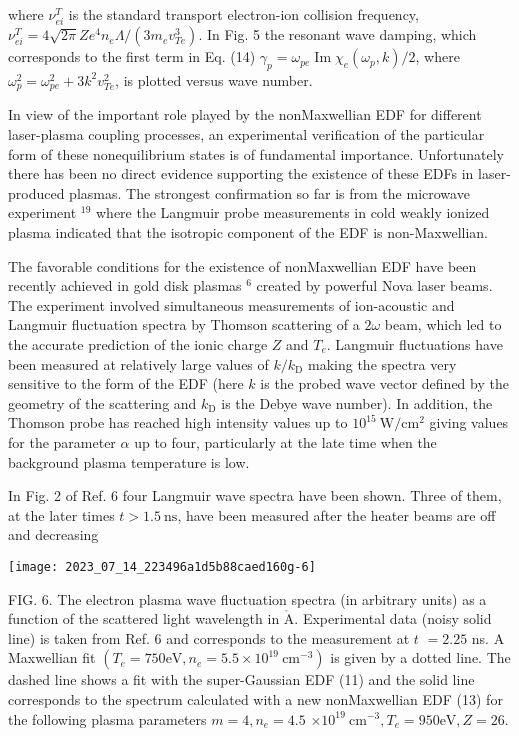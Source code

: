 \documentclass[10pt]{article}
\def\AA{\mathring{\mathrm{A}}}
\begin{document}
where $\nu_{e i}^{T}$ is the standard transport electron-ion collision frequency, $\nu_{e i}^{T}=4 \sqrt{2 \pi} Z e^{4} n_{e} \Lambda /\left(3 m_{e} v_{T e}^{3}\right)$. In Fig. 5 the resonant wave damping, which corresponds to the first term in Eq. (14) $\gamma_{p}=\omega_{p e} \operatorname{Im} \chi_{e}\left(\omega_{p}, k\right) / 2$, where $\omega_{p}^{2}=\omega_{p e}^{2}+3 k^{2} v_{T e}^{2}$, is plotted versus wave number.

In view of the important role played by the nonMaxwellian EDF for different laser-plasma coupling processes, an experimental verification of the particular form of these nonequilibrium states is of fundamental importance. Unfortunately there has been no direct evidence supporting the existence of these EDFs in laser-produced plasmas. The strongest confirmation so far is from the microwave experiment $^{19}$ where the Langmuir probe measurements in cold weakly ionized plasma indicated that the isotropic component of the EDF is non-Maxwellian.

The favorable conditions for the existence of nonMaxwellian EDF have been recently achieved in gold disk plasmas ${ }^{6}$ created by powerful Nova laser beams. The experiment involved simultaneous measurements of ion-acoustic and Langmuir fluctuation spectra by Thomson scattering of a $2 \omega$ beam, which led to the accurate prediction of the ionic charge $Z$ and $T_{e}$. Langmuir fluctuations have been measured at relatively large values of $k / k_{\mathrm{D}}$ making the spectra very sensitive to the form of the EDF (here $k$ is the probed wave vector defined by the geometry of the scattering and $k_{\mathrm{D}}$ is the Debye wave number). In addition, the Thomson probe has reached high intensity values up to $10^{15} \mathrm{~W} / \mathrm{cm}^{2}$ giving values for the parameter $\alpha$ up to four, particularly at the late time when the background plasma temperature is low.

In Fig. 2 of Ref. 6 four Langmuir wave spectra have been shown. Three of them, at the later times $t>1.5 \mathrm{~ns}$, have been measured after the heater beams are off and decreasing

\begin{center}
\texttt{[image: 2023\_07\_14\_223496a1d5b88caed160g-6]}
\end{center}

FIG. 6. The electron plasma wave fluctuation spectra (in arbitrary units) as a function of the scattered light wavelength in $\AA$. Experimental data (noisy solid line) is taken from Ref. 6 and corresponds to the measurement at $t$ $=2.25$ ns. A Maxwellian fit $\left(T_{e}=750 \mathrm{eV}, n_{e}=5.5 \times 10^{19} \mathrm{~cm}^{-3}\right)$ is given by a dotted line. The dashed line shows a fit with the super-Gaussian EDF (11) and the solid line corresponds to the spectrum calculated with a new nonMaxwellian EDF (13) for the following plasma parameters $m=4, n_{e}=4.5$ $\times 10^{19} \mathrm{~cm}^{-3}, T_{e}=950 \mathrm{eV}, Z=26$.
\end{document}
